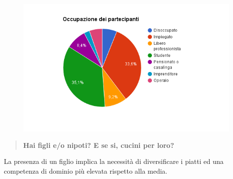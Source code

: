 \begin{figure}[H]
	\centering
	\includegraphics[scale=0.6]{img/chart_occupazione}
\end{figure}

\begin{quote}
	\textbf{Hai figli e/o nipoti? E se si, cucini per loro?}
\end{quote}

La presenza di un figlio implica la necessità di diversificare i piatti ed una
competenza di dominio più elevata rispetto alla media.\\

